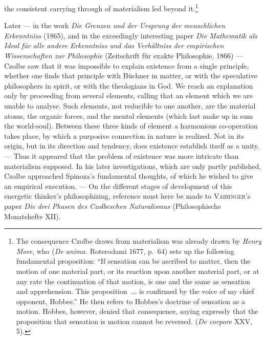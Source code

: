 \documentclass[12pt,a4paper]{book}
\begin{document}
the consistent carrying through of materialism led beyond
it.\footnote{The consequence Czolbe draws from materialism was already drawn by
\emph{Henry More}, who (\textit{De anima.} Roterodami 1677, p.~64) sets up the
following fundamental proposition: ``If sensation can be ascribed to matter,
then the motion of one material part, or its reaction upon another material
part, or at any rate the continuation of that motion, is one and the same as
sensation and apprehension. This proposition~... is confirmed by the voice of my
chief opponent, Hobbes.'' He then refers to Hobbes's doctrine of sensation as a
motion. Hobbes, however, denied that consequence, saying expressly that the
proposition that sensation is motion cannot be reversed. (\textit{De corpore}
XXV, 5).}

Later --- in the work \textit{Die Grenzen und der Ursprung der menschlichen
Erkenntniss} (1865), and in the exceedingly interesting paper \textit{Die
Mathematik als Ideal für alle andere Erkenntniss und das Verhältniss der
empirischen Wissenschaften zur Philosophie} (Zeitschrift für exakte Philosophie,
1866) --- Czolbe saw that it was impossible to explain existence from a single
principle, whether one finds that principle with Büchner in matter, or with the
speculative philosophers in spirit, or with the theologians in God. We reach an
explanation only by proceeding from several elements, calling that an element
which we are unable to analyse. Such elements, not reducible to one another, are
the material atoms, the organic forces, and the mental elements (which last make
up in sum the world-soul). Between these three kinds of element a harmonious
co-operation takes place, by which a purposive connection in nature is realized.
Not in its origin, but in its direction and tendency, does existence establish
itself as a unity. --- Thus it appeared that the problem of existence was more
intricate than materialism supposed. In his later investigations, which are only
partly published, Czolbe approached Spinoza's fundamental thoughts, of which he
wished to give an empirical execution. --- On the different stages of
development of this energetic thinker's philosophizing, reference must here be
made to \textsc{Vaihinger}'s paper \textit{Die drei Phasen des Czolbeschen
Naturalismus} (Philosophische Monatshefte XII).
\end{document}
